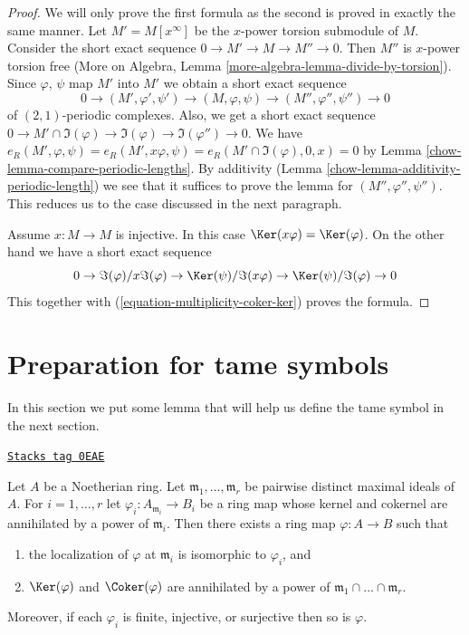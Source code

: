 \begin{proof}

We will only prove the first formula as the second is proved
in exactly the same manner.
Let $M' = M[x^\infty]$ be the $x$-power torsion submodule of $M$.
Consider the short exact sequence $0 \to M' \to M \to M'' \to 0$.
Then $M''$ is $x$-power torsion free (More on Algebra, Lemma
\ref{more-algebra-lemma-divide-by-torsion}).
Since $\varphi$, $\psi$ map $M'$ into $M'$
we obtain a short exact sequence
$$
0 \to (M', \varphi', \psi') \to (M, \varphi, \psi) \to
(M'', \varphi'', \psi'') \to 0
$$
of $(2, 1)$-periodic complexes. Also, we get a short exact sequence
$0 \to M' \cap \Im(\varphi) \to \Im(\varphi) \to \Im(\varphi'') \to 0$.
We have
$e_R(M', \varphi, \psi) = e_R(M', x\varphi, \psi) =
e_R(M' \cap \Im(\varphi), 0, x) = 0$
by Lemma \ref{chow-lemma-compare-periodic-lengths}.
By additivity (Lemma \ref{chow-lemma-additivity-periodic-length})
we see that it suffices to prove the lemma for $(M'', \varphi'', \psi'')$.
This reduces us to the case discussed in the next paragraph.

\medskip\noindent
Assume $x : M \to M$ is injective.
In this case $\Ker(x\varphi) = \Ker(\varphi)$.
On the other hand we have a short exact sequence
$$
0 \to \Im(\varphi)/x\Im(\varphi) \to
\Ker(\psi)/\Im(x\varphi) \to \Ker(\psi)/\Im(\varphi) \to 0
$$
This together with (\ref{equation-multiplicity-coker-ker}) proves the formula.
\end{proof}

\section{Preparation for tame symbols}
\label{chow-section-preparation-tame-symbol}
In this section we put some lemma that will help us define the
tame symbol in the next section.

\begin{lemma}
\label{chow-lemma-glue-at-max}
\href{https://stacks.math.columbia.edu/tag/0EAE}{\texttt{Stacks tag 0EAE}}

Let $A$ be a Noetherian ring. Let $\mathfrak m_1, \ldots, \mathfrak m_r$
be pairwise distinct maximal ideals of $A$. For $i = 1, \ldots, r$ let
$\varphi_i : A_{\mathfrak m_i} \to B_i$ be a ring map whose
kernel and cokernel are annihilated by a power
of $\mathfrak m_i$. Then there exists a ring map $\varphi : A \to B$ such
that
\begin{enumerate}
\item the localization of $\varphi$ at $\mathfrak m_i$ is
isomorphic to $\varphi_i$, and
\item $\Ker(\varphi)$ and $\Coker(\varphi)$ are annihilated
by a power of $\mathfrak m_1 \cap \ldots \cap \mathfrak m_r$.
\end{enumerate}
Moreover, if each $\varphi_i$ is finite, injective, or
surjective then so is $\varphi$.
\end{lemma}

